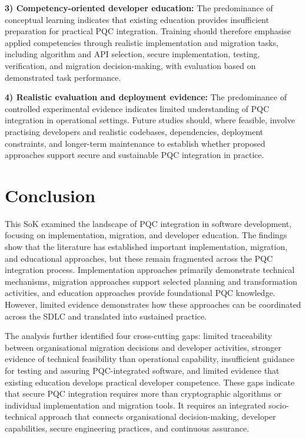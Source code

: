 \documentclass[letterpaper,twocolumn,10pt]{article}
\begin{document}
\textbf{3) Competency-oriented developer education:} The predominance of conceptual learning indicates that existing education provides insufficient preparation for practical PQC integration. Training should therefore emphasise applied competencies through realistic implementation and migration tasks, including algorithm and API selection, secure implementation, testing, verification, and migration decision-making, with evaluation based on demonstrated task performance.

\textbf{4) Realistic evaluation and deployment evidence:} The predominance of controlled experimental evidence indicates limited understanding of PQC integration in operational settings. Future studies should, where feasible, involve practising developers and realistic codebases, dependencies, deployment constraints, and longer-term maintenance to establish whether proposed approaches support secure and sustainable PQC integration in practice.

\section{Conclusion}
\label{Conclu}

This SoK examined the landscape of PQC integration in software development, focusing on implementation, migration, and developer education. The findings show that the literature has established important implementation, migration, and educational approaches, but these remain fragmented across the PQC integration process. Implementation approaches primarily demonstrate technical mechanisms, migration approaches support selected planning and transformation activities, and education approaches provide foundational PQC knowledge. However, limited evidence demonstrates how these approaches can be coordinated across the SDLC and translated into sustained practice.

The analysis further identified four cross-cutting gaps: limited traceability between organisational migration decisions and developer activities, stronger evidence of technical feasibility than operational capability, insufficient guidance for testing and assuring PQC-integrated software, and limited evidence that existing education develops practical developer competence. These gaps indicate that secure PQC integration requires more than cryptographic algorithms or individual implementation and migration tools. It requires an integrated socio-technical approach that connects organisational decision-making, developer capabilities, secure engineering practices, and continuous assurance.
\end{document}
